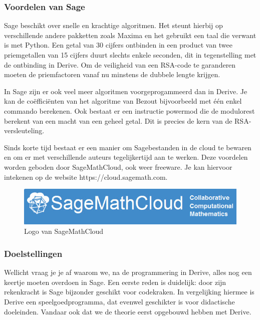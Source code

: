 \subsubsection*{Voordelen van Sage}

Sage beschikt over snelle en krachtige algoritmen. Het steunt hierbij op verschillende andere pakketten zoals Maxima en het gebruikt een taal die verwant is met Python. Een getal van 30 cijfers ontbinden in een product van twee priemgetallen van 15 cijfers duurt slechts enkele seconden, dit in tegenstelling met de ontbinding in Derive. Om de veiligheid van een RSA-code te garanderen moeten de priemfactoren vanaf nu minstens de dubbele lengte krijgen.

In Sage zijn er ook veel meer algoritmen voorgeprogammeerd dan in Derive. Je kan de coëfficiënten van het algoritme van Bezout bijvoorbeeld met één enkel commando berekenen. Ook bestaat er een instructie powermod die de modulorest berekent van een macht van een geheel getal. Dit is precies de kern van de RSA-versleuteling.

Sinds korte tijd bestaat er een manier om Sagebestanden in de cloud te bewaren en om er met verschillende auteurs tegelijkertijd aan te werken. Deze voordelen worden geboden door SageMathCloud, ook weer freeware. Je kan hiervoor intekenen op de website https://cloud.sagemath.com. 

\begin{figure} [h]
\label{sagelogo}
\centering
\includegraphics[width=\textwidth]{sagelogo.jpg}
\caption{Logo van SageMathCloud}
\end{figure}

\subsubsection*{Doelstellingen}

Wellicht vraag je je af waarom we, na de programmering in Derive, alles nog een keertje moeten overdoen in Sage. Een eerste reden is duidelijk: door zijn rekenkracht is Sage bijzonder geschikt voor codekraken. In vergelijking hiermee is Derive een speelgoedprogramma, dat evenwel geschikter is voor didactische doeleinden. Vandaar ook dat we de theorie eerst opgebouwd hebben met Derive.


